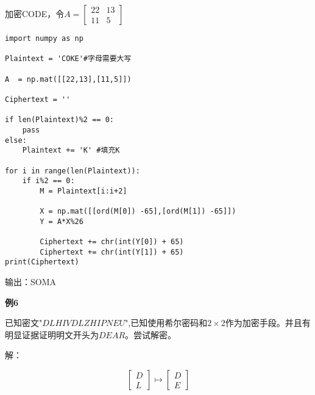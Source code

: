 \documentclass{article}
\begin{document}
加密CODE，令$A=\left[\begin{array}{cc}
22 & 13 \\
11 & 5
\end{array}\right]$
\begin{lstlisting}
import numpy as np

Plaintext = 'COKE'#字母需要大写

A  = np.mat([[22,13],[11,5]])

Ciphertext = ''

if len(Plaintext)%2 == 0:
    pass
else:
    Plaintext += 'K' #填充K

for i in range(len(Plaintext)):
    if i%2 == 0:
        M = Plaintext[i:i+2]
        
        X = np.mat([[ord(M[0]) -65],[ord(M[1]) -65]]) 
        Y = A*X%26
        
        Ciphertext += chr(int(Y[0]) + 65)
        Ciphertext += chr(int(Y[1]) + 65)
print(Ciphertext)    
\end{lstlisting}

输出：SOMA

\clearpage

\textbf{例6}

已知密文"$DLHIVDLZHIPNEU$",已知使用希尔密码和$2 \times 2$作为加密手段。并且有明显证据证明明文开头为$DEAR$。尝试解密。

解：




$$
\left[\begin{array}{l}
D \\
L
\end{array}\right] \mapsto\left[\begin{array}{l}
D \\
E
\end{array}\right]
$$
\end{document}
